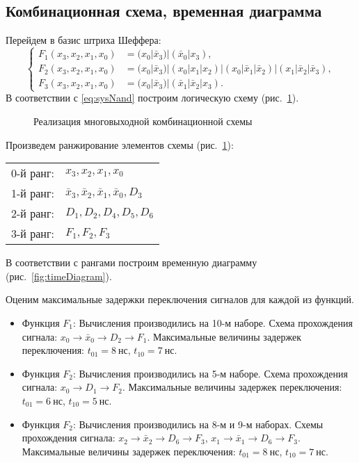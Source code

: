 \subsection{Комбинационная схема, временная диаграмма}

Перейдем в базис штриха Шеффера:
\begin{equation} \label{eq:sysNand}
	\left\{
	\begin{aligned}
		F_1(x_3, x_2, x_1, x_0) &= (x_0 | \bar x_3) | (\bar x_0 | x_3),\\
		F_2(x_3, x_2, x_1, x_0) &= (x_0 | \bar x_3) |(x_0 | x_1 | x_2) | (x_0 | \bar x_1 | \bar x_2) | (x_1 | \bar x_2 | \bar x_3),\\
		F_3(x_3, x_2, x_1, x_0) &= (x_0 | \bar x_3) | (\bar x_1 | \bar x_2 | x_3).
	\end{aligned}
	\right.
\end{equation}
В соответствии с \eqref{eq:sysNand} построим логическую схему (рис.~\ref{fig:circuit}).
\begin{figure}[h!]
	\centering\rectangle{15cm}{19.5cm}
	\caption{Реализация многовыходной комбинационной схемы} \label{fig:circuit}
\end{figure}

Произведем ранжирование элементов схемы (рис.~\ref{fig:circuit}):
\begin{center}
\begin{tabular}{ll}
	0-й ранг: & $x_3, x_2, x_1, x_0$ \\
	1-й ранг: & $\bar x_3, \bar x_2, \bar x_1, \bar x_0, D_3$ \\
	2-й ранг: & $D_1, D_2, D_4, D_5, D_6$ \\
	3-й ранг: & $F_1, F_2, F_3$ \\
\end{tabular}
\end{center}
В соответствии с рангами построим временную диаграмму (рис.~\ref{fig:timeDiagram}).

Оценим максимальные задержки переключения сигналов для каждой из функций.
\begin{itemize}[noitemsep,topsep=0pt]
	\item Функция $F_1$:
	Вычисления производились на 10-м наборе. Схема прохождения сигнала: $x_0 \rightarrow \bar x_0 \rightarrow D_2 \rightarrow F_1$. Максимальные величины задержек переключения: $t_{01} = 8~нс$, $t_{10} = 7~нс$. 
	
	\item Функция $F_2$:
	Вычисления производились на 5-м наборе. Схема прохождения сигнала: $x_0  \rightarrow D_1 \rightarrow F_2$. Максимальные величины задержек переключения: $t_{01} = 6~нс$, $t_{10} = 5~нс$.
	
	\item Функция $F_2$:
	Вычисления производились на 8-м и 9-м наборах. Схемы прохождения сигнала: $x_2 \rightarrow \bar x_2 \rightarrow D_6 \rightarrow F_3$, $x_1 \rightarrow \bar x_1 \rightarrow D_6 \rightarrow F_3$. Максимальные величины задержек переключения: $t_{01} = 8~нс$, $t_{10} = 7~нс$.
\end{itemize}

